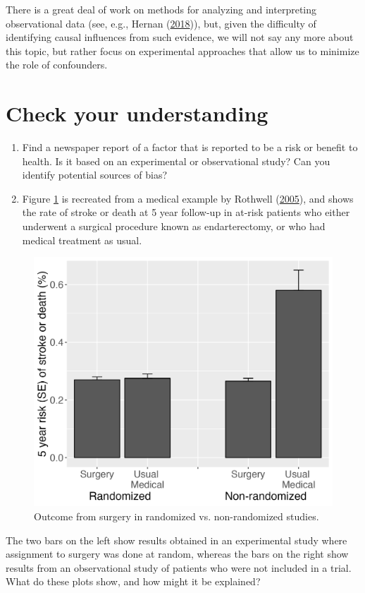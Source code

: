 \documentclass{krantz}
\begin{document}
There is a great deal of work on methods for analyzing and interpreting observational data (see, e.g., Hernan (\protect\hyperlink{ref-hernan2018}{2018})), but, given the difficulty of identifying causal influences from such evidence, we will not say any more about this topic, but rather focus on experimental approaches that allow us to minimize the role of confounders.

\hypertarget{check-your-understanding-1}{%
\section{Check your understanding}\label{check-your-understanding-1}}

\begin{enumerate}
\def\labelenumi{\arabic{enumi}.}
\item
  Find a newspaper report of a factor that is reported to be a risk or benefit to health. Is it based on an experimental or observational study? Can you identify potential sources of bias?
\item
  Figure \ref{fig:rothwellfig} is recreated from a medical example by Rothwell (\protect\hyperlink{ref-rothwell2005}{2005}), and shows the rate of stroke or death at 5 year follow-up in at-risk patients who either underwent a surgical procedure known as endarterectomy, or who had medical treatment as usual.
\end{enumerate}

\begin{figure}

{\centering \includegraphics[width=0.5\linewidth,height=0.5\textheight]{images_bw/rothwellplot} 

}

\caption{Outcome from surgery in randomized vs. non-randomized studies.}\label{fig:rothwellfig}
\end{figure}

The two bars on the left show results obtained in an experimental study where assignment to surgery was done at random, whereas the bars on the right show results from an observational study of patients who were not included in a trial. What do these plots show, and how might it be explained?
\end{document}
